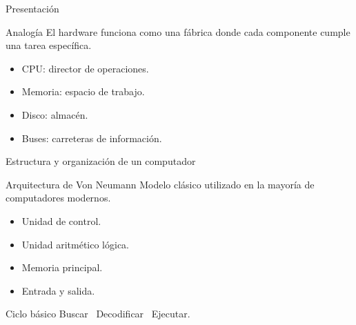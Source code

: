 \documentclass[10pt, aspectratio=169]{beamer}
\begin{document}
	\begin{frame}{Presentación}
		
		\begin{block}{Analogía}
			El hardware funciona como una fábrica donde cada componente cumple una tarea específica.
		\end{block}
		
		\begin{itemize}
			\item CPU: director de operaciones.
			\item Memoria: espacio de trabajo.
			\item Disco: almacén.
			\item Buses: carreteras de información.
		\end{itemize}
		
	\end{frame}
	
	\begin{frame}{Estructura y organización de un computador}
		
		\small
		
		\begin{block}{Arquitectura de Von Neumann}
			Modelo clásico utilizado en la mayoría de computadores modernos.
		\end{block}
		
		\begin{itemize}
			\item Unidad de control.
			\item Unidad aritmético lógica.
			\item Memoria principal.
			\item Entrada y salida.
		\end{itemize}
		
		\vspace{0.3cm}
		
		\begin{block}{Ciclo básico}
			Buscar \textrightarrow\ Decodificar \textrightarrow\ Ejecutar.
		\end{block}
		
	\end{frame}
	
\end{document}
